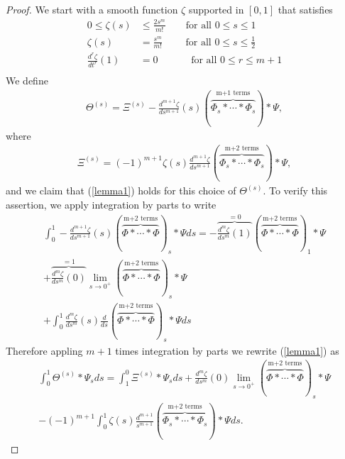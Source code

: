 \documentclass[12pt]{article}  %
\numberwithin{equation}{subsection}
\theoremstyle{plain}
\begin{document}
\begin{proof}
	We start with a smooth function $\zeta$ supported in $[0,1]$ that satisfies
	\begin{align*}
		0\le \zeta(s) &\le \frac{2s^m}{m!} \qquad \text{for all } 0\le s \le 1 \\ 
		\zeta(s) &= \frac{s^m}{m!} \qquad \text{ for all } 0 \le s \le \frac{1}{2} \\
		\frac{d^r\zeta}{dt^r}(1) &= 0 \qquad \quad \text{ for all } 0\le r \le m+1 \\ \label{lemma3}
	\end{align*}
	We define
	\begin{align}
		\varTheta^{(s)} = \varXi^{(s)} - \frac{d^{m+1}\zeta}{ds^{m+1}}(s) \left( \stackrel{\text{m+1 terms}}{\overbrace{\varPhi_s* \cdots *\varPhi_s}}\right) * \varPsi,
	\end{align}
	where
	\begin{align*}
		\varXi^{(s)} = (-1)^{m+1}\zeta(s)\frac{d^{m+1}\zeta}{ds^{m+1}}\left( \stackrel{\text{m+2 terms}}{\overbrace{\varPhi_s* \cdots *\varPhi_s}}\right) * \varPsi,
	\end{align*}
	and we claim that (\ref{lemma1}) holds for this choice of $\varTheta^{(s)}$. To verify this assertion, we apply integration by parts to write
	\begin{align*}
		\int_{0}^{1}-\frac{d^{m+1}\zeta}{ds^{m+1}}(s)( \stackrel{\text{m+2 terms}}{\overbrace{\varPhi* \cdots *\varPhi}})_s * \varPsi ds = -\stackrel{=0}{\overbrace{\frac{d^m\zeta}{ds^m}(1)}}( \stackrel{\text{m+2 terms}}{\overbrace{\varPhi* \cdots *\varPhi}})_1 * \varPsi \\
		+\stackrel{=1}{\overbrace{\frac{d^m\zeta}{ds^m}(0)}}\lim_{s\rightarrow 0^+}( \stackrel{\text{m+2 terms}}{\overbrace{\varPhi* \cdots *\varPhi}})_s*\varPsi\\
		+\int_{0}^{1}\frac{d^m\zeta}{ds^m}(s)\frac{d}{ds}( \stackrel{\text{m+2 terms}}{\overbrace{\varPhi* \cdots *\varPhi}})_s*\varPsi ds
	\end{align*}
	Therefore appling $m+1$ times integration by parts we rewrite (\ref{lemma1}) as 
	\begin{align*}
		\int_{0}^{1}\varTheta^{(s)}*\varPsi_sds = \int_{1}^{0}\varXi^{(s)}*\varPsi_sds + \frac{d^{m}\zeta}{ds^{m}}(0)\lim_{s\rightarrow 0^+}( \stackrel{\text{m+2 terms}}{\overbrace{\varPhi* \cdots *\varPhi}})_s*\varPsi\\
		-(-1)^{m+1}\int_{0}^{1}\zeta(s)\frac{d^{m+1}}{s^{m+1}}\left( \stackrel{\text{m+2 terms}}{\overbrace{\varPhi_s* \cdots *\varPhi_s}}\right) * \varPsi ds.

\end{align*}
\end{proof}
\end{document}
